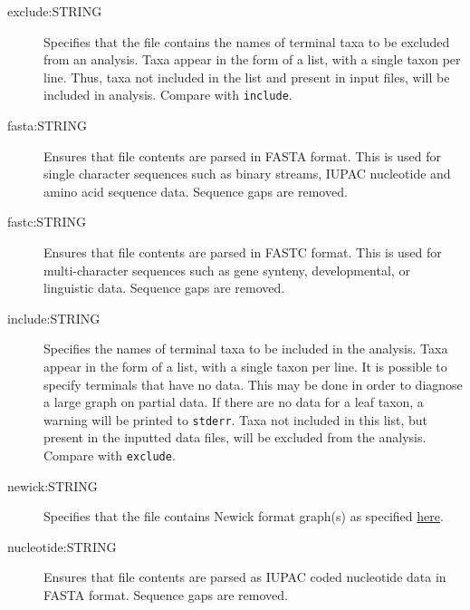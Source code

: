 \begin{description}
		\item [exclude:STRING] Specifies that the file contains the names of terminal taxa to be 
		excluded from an analysis. Taxa appear in the form of a list, with a single taxon per 
		line. Thus, taxa not included in the list and present in input files, will be included in 
		analysis. Compare with \texttt{include}.
			
		\item [fasta:STRING] Ensures that file contents are parsed in FASTA \citep{PearsonandLipman1988}
		format. This is used for single character sequences such as binary streams, IUPAC 
		nucleotide and amino acid sequence data. Sequence gaps are removed.
			
		\item [fastc:STRING] Ensures that file contents are parsed in FASTC \citep{WheelerandWashburn2019}
		format. This is used for multi-character sequences such as gene synteny, developmental, 
		or linguistic data.   Sequence gaps are removed.
			
		

	
		\item [include:STRING] Specifies the names of terminal taxa to be included in the analysis. 
		Taxa appear in the form of a list, with a single taxon per line. It is possible to specify 
		terminals that have no data. This may be done in order to diagnose a large graph on 
		partial data. If there are no data for a leaf taxon, a warning will be printed to \texttt{stderr}. 
		Taxa not included in this list, but present in the inputted data files, will be excluded from 
		the analysis. Compare with \texttt{exclude}.
			
		\item [newick:STRING] Specifies that the file contains Newick format graph(s) as specified 
		\href{https://evolution.genetics.washington.edu/phylip/newick_doc.html}{here}.
			
		\item [nucleotide:STRING] Ensures that file contents are parsed as IUPAC coded nucleotide 
		data in FASTA \citep{PearsonandLipman1988} format. Sequence gaps are removed.
		

\end{description}
